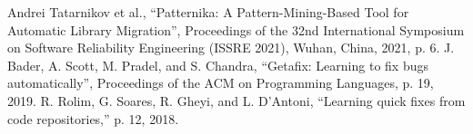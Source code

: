 \documentclass[letterpaper, 10 pt, conference]{ieeeconf}  %
\begin{document}



\begin{thebibliography}{99}
 Andrei Tatarnikov et al., “Patternika: A
Pattern-Mining-Based Tool for Automatic Library Migration”,
Proceedings of the 32nd International Symposium on Software
Reliability Engineering (ISSRE 2021), Wuhan, China, 2021, p. 6.
 J. Bader, A. Scott, M. Pradel, and S. Chandra, “Getafix:
Learning to fix bugs automatically”, Proceedings of the ACM on Programming
Languages, p. 19, 2019.
 R. Rolim, G. Soares, R. Gheyi, and L. D’Antoni, “Learning
quick fixes from code repositories,” p. 12, 2018.
\end{thebibliography}
\end{document}
